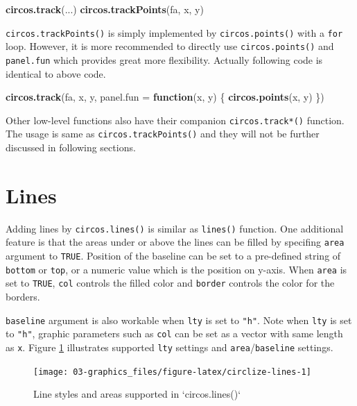 \documentclass[]{book}
\newenvironment{Shaded}{\begin{snugshade}}{\end{snugshade}}
\newcommand{\KeywordTok}[1]{\textcolor[rgb]{0.13,0.29,0.53}{\textbf{#1}}}
\newcommand{\DataTypeTok}[1]{\textcolor[rgb]{0.13,0.29,0.53}{#1}}
\newcommand{\ControlFlowTok}[1]{\textcolor[rgb]{0.13,0.29,0.53}{\textbf{#1}}}
\newcommand{\NormalTok}[1]{#1}
\theoremstyle{definition}
\theoremstyle{definition}
\theoremstyle{remark}
\begin{document}
\begin{Shaded}
\begin{Highlighting}[]
\KeywordTok{circos.track}\NormalTok{(...)}
\KeywordTok{circos.trackPoints}\NormalTok{(fa, x, y)}
\end{Highlighting}
\end{Shaded}

\texttt{circos.trackPoints()} is simply implemented by
\texttt{circos.points()} with a \texttt{for} loop. However, it is more
recommended to directly use \texttt{circos.points()} and
\texttt{panel.fun} which provides great more flexibility. Actually
following code is identical to above code.

\begin{Shaded}
\begin{Highlighting}[]
\KeywordTok{circos.track}\NormalTok{(fa, x, y, }\DataTypeTok{panel.fun =} \ControlFlowTok{function}\NormalTok{(x, y) \{}
    \KeywordTok{circos.points}\NormalTok{(x, y)}
\NormalTok{\})}
\end{Highlighting}
\end{Shaded}

Other low-level functions also have their companion
\texttt{circos.track*()} function. The usage is same as
\texttt{circos.trackPoints()} and they will not be further discussed in
following sections.

\section{Lines}\label{lines}

Adding lines by \texttt{circos.lines()} is similar as \texttt{lines()}
function. One additional feature is that the areas under or above the
lines can be filled by specifing \texttt{area} argument to
\texttt{TRUE}. Position of the baseline can be set to a pre-defined
string of \texttt{bottom} or \texttt{top}, or a numeric value which is
the position on y-axis. When \texttt{area} is set to \texttt{TRUE},
\texttt{col} controls the filled color and \texttt{border} controls the
color for the borders.

\texttt{baseline} argument is also workable when \texttt{lty} is set to
\texttt{"h"}. Note when \texttt{lty} is set to \texttt{"h"}, graphic
parameters such as \texttt{col} can be set as a vector with same length
as \texttt{x}. Figure \ref{fig:circlize-lines} illustrates supported
\texttt{lty} settings and \texttt{area}/\texttt{baseline} settings.

\begin{figure}

{\centering \texttt{[image: 03-graphics\_files/figure-latex/circlize-lines-1]} 

}

\caption{Line styles and areas supported in `circos.lines()`}\label{fig:circlize-lines}
\end{figure}
\end{document}
